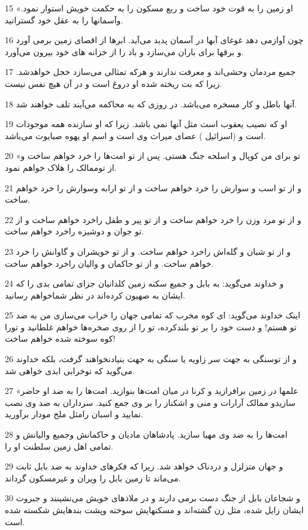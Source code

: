\par 15 «او زمین را به قوت خود ساخت و ربع مسکون را به حکمت خویش استوار نمود. وآسمانها را به عقل خود گسترانید.
\par 16 چون آوازمی دهد غوغای آبها در آسمان پدید می‌آید. ابرها از اقصای زمین برمی آورد و برقها برای باران می‌سازد و باد را از خزانه های خود بیرون می‌آورد.
\par 17 جمیع مردمان وحشی‌اند و معرفت ندارند و هر‌که تمثالی می‌سازد خجل خواهدشد. زیرا که بت ریخته شده او دروغ است و در آن هیچ نفس نیست.
\par 18 آنها باطل و کار مسخره می‌باشد. در روزی که به محاکمه می‌آیند تلف خواهند شد.
\par 19 او که نصیب یعقوب است مثل آنها نمی باشد. زیرا که او سازنده همه موجودات است و (اسرائیل ) عصای میراث وی است و اسم او یهوه صبایوت می‌باشد.
\par 20 «تو برای من کوپال و اسلحه جنگ هستی. پس از تو امت‌ها را خرد خواهم ساخت و از توممالک را هلاک خواهم نمود.
\par 21 و از تو اسب و سوارش را خرد خواهم ساخت و از تو ارابه وسوارش را خرد خواهم ساخت.
\par 22 و از تو مرد وزن را خرد خواهم ساخت و از تو پیر و طفل راخرد خواهم ساخت و از تو جوان و دوشیزه راخرد خواهم ساخت.
\par 23 و از تو شبان و گله‌اش راخرد خواهم ساخت. و از تو خویشران و گاوانش را خرد خواهم ساخت. و از تو حاکمان و والیان راخرد خواهم ساخت.
\par 24 و خداوند می‌گوید: به بابل و جمیع سکنه زمین کلدانیان جزای تمامی بدی را که ایشان به صهیون کرده‌اند در نظر شماخواهم رسانید.
\par 25 اینک خداوند می‌گوید: ای کوه مخرب که تمامی جهان را خراب می‌سازی من به ضد تو هستم! و دست خود را بر تو بلندکرده، تو را از روی صخره‌ها خواهم غلطانید و تورا کوه سوخته شده خواهم ساخت!
\par 26 و از توسنگی به جهت سر زاویه یا سنگی به جهت بنیادنخواهند گرفت، بلکه خداوند می‌گوید که توخرابی ابدی خواهی شد.
\par 27 «علمها در زمین برافرازید و کرنا در میان امت‌ها بنوازید. امت‌ها را به ضد او حاضر سازیدو ممالک آرارات و منی و اشکناز را بر وی جمع کنید. سرداران به ضد وی نصب نمایید و اسبان رامثل ملخ مودار برآورید.
\par 28 امت‌ها را به ضد وی مهیا سازید. پادشاهان مادیان و حاکمانش وجمیع والیانش و تمامی اهل زمین سلطنت او را.
\par 29 و جهان متزلزل و دردناک خواهد شد. زیرا که فکرهای خداوند به ضد بابل ثابت می‌ماند تا زمین بابل را ویران و غیرمسکون گرداند.
\par 30 و شجاعان بابل از جنگ دست برمی دارند و در ملاذهای خویش می‌نشینند و جبروت ایشان زایل شده، مثل زن گشته‌اند و مسکنهایش سوخته وپشت بندهایش شکسته شده است.
